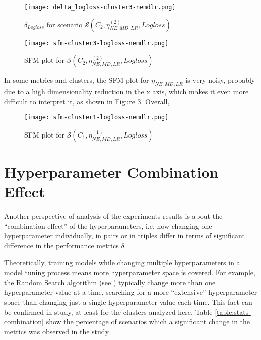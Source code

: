 \begin{figure}[H]
    \centering
    \texttt{[image: delta\_logloss-cluster3-nemdlr.png]}
    \caption{$\delta_{Logloss}$ for scenario $\mathcal{S}(C_2, \eta^{(2)}_{NE, MD, LR}, Logloss)$}
    \label{fig:delta-nemdlr-1}
\end{figure}

\begin{figure}[H]
    \centering
    \texttt{[image: sfm-cluster3-logloss-nemdlr.png]}
    \caption{SFM plot for $\mathcal{S}(C_2, \eta^{(2)}_{NE, MD, LR}, Logloss)$}
    \label{fig:sfm-nemdlr-1}
\end{figure}

In some metrics and clusters, the SFM plot for $\eta_{NE, MD, LR}$ is very noisy, probably due to a high dimensionality reduction in the x axis, which makes it even more difficult to interpret it, as shown in Figure \ref{fig:sfm-nemdlr-2}. Overall, 

\begin{figure}[H]
    \centering
    \texttt{[image: sfm-cluster1-logloss-nemdlr.png]}
    \caption{SFM plot for $\mathcal{S}(C_1, \eta^{(1)}_{NE, MD, LR}, Logloss)$}
    \label{fig:sfm-nemdlr-2}
\end{figure}

\section{Hyperparameter Combination Effect}

Another perspective of analysis of the experiments results is about the ``combination effect'' of the hyperparameters, i.e. how changing one hyperparameter individually, in pairs or in triples differ in terms of significant difference in the performance metrics $\delta$.

Theoretically, training models while changing multiple hyperparameters in a model tuning process means more hyperparameter space is covered. For example, the Random Search algorithm (see \cite{probst2018tunability}) typically change more than one hyperparameter value at a time, searching for a more ``extensive'' hyperparameter space than changing just a single hyperparameter value each time. This fact can be confirmed in study, at least for the clusters analyzed here. Table \ref{table:stats-combination} show the percentage of scenarios which a significant change in the metrics was observed in the study.

